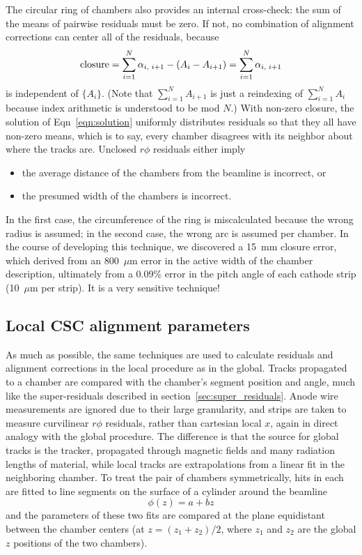 \documentclass[12pt]{article}
\begin{document}
The circular ring of chambers also provides an internal cross-check:
the sum of the means of pairwise residuals must be zero.  If not, no
combination of alignment corrections can center all of the residuals,
because
\begin{equation}
\mbox{closure} = \sum_{i=1}^N \alpha_{i\mbox{\scriptsize, }i+1} - (A_i - A_{i+1}) = \sum_{i=1}^N \alpha_{i\mbox{\scriptsize, }i+1}
\end{equation}
is independent of $\{A_i\}$.  (Note that $\sum_{i=1}^N A_{i+1}$ is
just a reindexing of $\sum_{i=1}^N A_i$ because index arithmetic is
understood to be mod $N$.)  With non-zero closure, the solution of
Eqn~\ref{eqn:solution} uniformly distributes residuals so that they
all have non-zero means, which is to say, every chamber disagrees with
its neighbor about where the tracks are.  Unclosed $r\phi$ residuals
either imply
\begin{itemize}
\item the average distance of the chambers from the beamline is
  incorrect, or
\item the presumed width of the chambers is incorrect.
\end{itemize}
In the first case, the circumference of the ring is miscalculated
because the wrong radius is assumed; in the second case, the wrong arc
is assumed per chamber.  In the course of developing this technique,
we discovered a 15~mm closure error, which derived from an 800~$\mu$m
error in the active width of the chamber description, ultimately from
a 0.09\% error in the pitch angle of each cathode strip (10~$\mu$m per
strip).  It is a very sensitive technique!

\subsection{Local CSC alignment parameters}

As much as possible, the same techniques are used to calculate
residuals and alignment corrections in the local procedure as in the
global.  Tracks propagated to a chamber are compared with the
chamber's segment position and angle, much like the super-residuals
described in section~\ref{sec:super_residuals}.  Anode wire
measurements are ignored due to their large granularity, and strips
are taken to measure curvilinear $r\phi$ residuals, rather than
cartesian local $x$, again in direct analogy with the global
procedure.  The difference is that the source for global tracks is the
tracker, propagated through magnetic fields and many radiation lengths
of material, while local tracks are extrapolations from a linear fit
in the neighboring chamber.  To treat the pair of chambers
symmetrically, hits in each are fitted to line segments on the surface
of a cylinder around the beamline
\begin{equation}
\phi(z) = a + bz
\end{equation}
and the parameters of these two fits are compared at the plane
equidistant between the chamber centers (at $z = (z_1 + z_2)/2$, where
$z_1$ and $z_2$ are the global $z$ positions of the two chambers).
\end{document}
